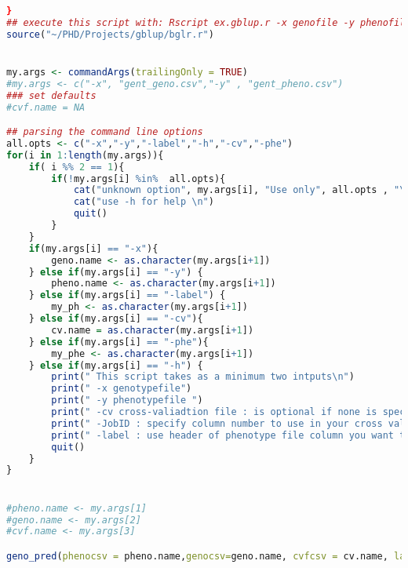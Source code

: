 \begin{lstlisting}[language=R]
  }
## execute this script with: Rscript ex.gblup.r -x genofile -y phenofile -c cv file
source("~/PHD/Projects/gblup/bglr.r")


my.args <- commandArgs(trailingOnly = TRUE)
#my.args <- c("-x", "gent_geno.csv","-y" , "gent_pheno.csv")
### set defaults 
#cvf.name = NA

## parsing the command line options 
all.opts <- c("-x","-y","-label","-h","-cv","-phe")
for(i in 1:length(my.args)){
    if( i %% 2 == 1){
        if(!my.args[i] %in%  all.opts){
            cat("unknown option", my.args[i], "Use only", all.opts , "\n")
            cat("use -h for help \n")
            quit()
        }
    }    
    if(my.args[i] == "-x"){
        geno.name <- as.character(my.args[i+1])
    } else if(my.args[i] == "-y") {
        pheno.name <- as.character(my.args[i+1])
    } else if(my.args[i] == "-label") {
        my_ph <- as.character(my.args[i+1])
    } else if(my.args[i] == "-cv"){
        cv.name = as.character(my.args[i+1])
    } else if(my.args[i] == "-phe"){
        my_phe <- as.character(my.args[i+1])
    } else if(my.args[i] == "-h") {
        print(" This script takes as a minimum two intputs\n")
        print(" -x genotypefile")
        print(" -y phenotypefile ")
        print(" -cv cross-valiadtion file : is optional if none is specified random 5 fold cv will be used")
        print(" -JobID : specify column number to use in your cross validation file")
        print(" -label : use header of phenotype file column you want to use")
        quit()
    }
}


#pheno.name <- my.args[1]
#geno.name <- my.args[2]
#cvf.name <- my.args[3]

geno_pred(phenocsv = pheno.name,genocsv=geno.name, cvfcsv = cv.name, label=my_ph,mod = "BRR", phe =my_phe)

\end{lstlisting}

